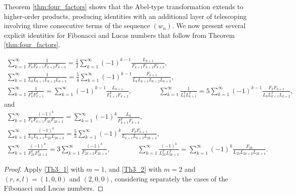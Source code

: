\documentclass[12pt,reqno]{article}
\begin{document}
Theorem \ref{thm:four_factors} shows that the Abel-type transformation extends to higher-order products, producing identities with an additional layer of telescoping involving three consecutive terms of the sequence $(w_n)$. We now present several explicit identities for Fibonacci and Lucas numbers that follow from Theorem \ref{thm:four_factors}.
\begin{corollary}
		\begin{gather*}
		\sum_{k=1}^\infty \frac{1}{F_{k}F_{k+1}F_{k+2}F_{k+3}} = \frac{1}{2}\sum_{k=1}^\infty (-1)^{k-1}  \frac{L_{k+1}}{F_{k+1}F_{k+2}F_{k+3}},\\
		\sum_{k=1}^\infty \frac{1}{L_{k} L_{k+1} L_{k+2}L_{k+3}} = \frac{5}{4} \sum_{k=1}^\infty (-1)^{k-1} \frac{ F_{k+1}}{L_kL_{k+1}L_{k+2}L_{k+3}},\\
		\sum_{k=1}^\infty \frac{1}{F_{k}^2 F_{k+1}^2} = \sum_{k=1}^\infty (-1)^{k-1} \frac{L_{k+1}}{F_{k+1}^2F_{k+2}},\qquad\qquad 
		\sum_{k=1}^\infty \frac{1}{L_{k}^2 L_{k+1}^2} = 5 \sum_{k=1}^\infty (-1)^{k-1} \frac{ F_k F_{k+1}}{L_{k}L_{k+1}^2L_{k+2}},
		\end{gather*}
	and 
		\begin{gather*}
		\sum_{k=1}^\infty \frac{(-1)^k}{F_{k} F_{k+1} F_{2k}F_{2k+2}} = \sum_{k=1}^\infty (-1)^{k} \frac{L_k}{F_{k+1}^2 F_{k+2}},\\
		\sum_{k=1}^\infty \frac{(-1)^k}{L_{k} L_{k+1} L_{2k}L_{2k+2}} = \frac{5}{3} \sum_{k=1}^\infty   (-1)^{k} \frac{F_kF_{k+1}}{L_{k+1} L_{k+2}L_{2k+2}},\\
		\sum_{k=1}^\infty \frac{(-1)^k}{F_{2k}^2 F_{2k+2}^2} = 3\sum_{k=1}^\infty  \frac{(-1)^{k}}{F_{2k+2}F_{2k+4}},\qquad\qquad
		\sum_{k=1}^\infty \frac{(-1)^k}{L_{2k}^2 L_{2k+2}^2} = \sum_{k=1}^\infty (-1)^{k} \frac{F_{2k}}{L_{2k} L_{2k+2}L_{2k+4}}.
		\end{gather*}
\end{corollary}
\begin{proof}
	Apply \eqref{Th3_1} with $m=1$, and \eqref{Th3_2} with $m=2$ and $(r,s,l)=(1,0,0)$ and $(2,0,0)$, considering separately the cases of the Fibonacci and Lucas numbers.
\end{proof}
\end{document}
